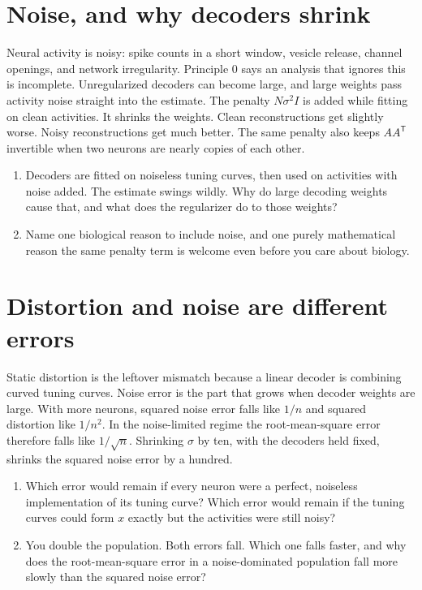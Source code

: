 \documentclass[11pt,letterpaper]{article}
\begin{document}
\section{Noise, and why decoders shrink}

\begin{idea}
Neural activity is noisy: spike counts in a short window, vesicle release, channel openings, and network irregularity. Principle 0 says an analysis that ignores this is incomplete. Unregularized decoders can become large, and large weights pass activity noise straight into the estimate. The penalty \(N\sigma^2 I\) is added while fitting on clean activities. It shrinks the weights. Clean reconstructions get slightly worse. Noisy reconstructions get much better. The same penalty also keeps \(AA^{\mathsf{T}}\) invertible when two neurons are nearly copies of each other.
\end{idea}

\begin{enumerate}
\item Decoders are fitted on noiseless tuning curves, then used on activities with noise added. The estimate swings wildly. Why do large decoding weights cause that, and what does the regularizer do to those weights?
\item Name one biological reason to include noise, and one purely mathematical reason the same penalty term is welcome even before you care about biology.
\end{enumerate}

\section{Distortion and noise are different errors}

\begin{idea}
Static distortion is the leftover mismatch because a linear decoder is combining curved tuning curves. Noise error is the part that grows when decoder weights are large. With more neurons, squared noise error falls like \(1/n\) and squared distortion like \(1/n^2\). In the noise-limited regime the root-mean-square error therefore falls like \(1/\sqrt{n}\). Shrinking \(\sigma\) by ten, with the decoders held fixed, shrinks the squared noise error by a hundred.
\end{idea}

\begin{enumerate}
\item Which error would remain if every neuron were a perfect, noiseless implementation of its tuning curve? Which error would remain if the tuning curves could form \(x\) exactly but the activities were still noisy?
\item You double the population. Both errors fall. Which one falls faster, and why does the root-mean-square error in a noise-dominated population fall more slowly than the squared noise error?
\end{enumerate}
\end{document}
